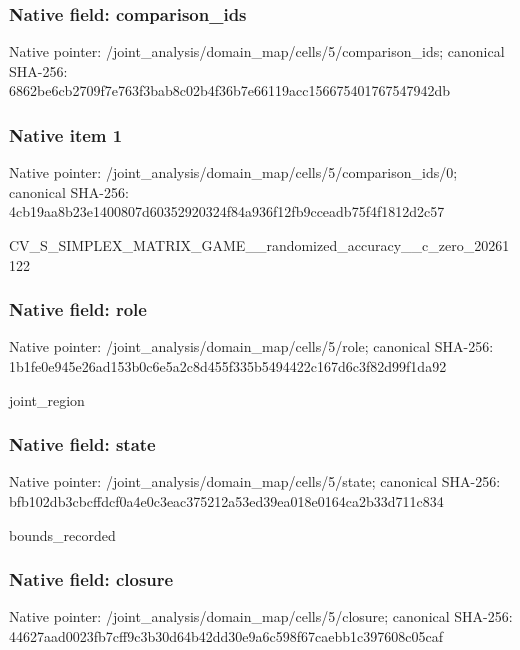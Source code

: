 \documentclass[10pt,a4paper]{article}
\begin{document}
\subsubsection{Native field: comparison\_ids}


Native pointer: /joint\_analysis/domain\_m\allowbreak{}ap/cells/5/comparison\_id\allowbreak{}s; canonical SHA-256: 6862be6cb2709f7e763f3bab\allowbreak{}8c02b4f36b7e66119acc1566\allowbreak{}75401767547942db



\subsubsection{Native item 1}


Native pointer: /joint\_analysis/domain\_m\allowbreak{}ap/cells/5/comparison\_id\allowbreak{}s/0; canonical SHA-256: 4cb19aa8b23e1400807d6035\allowbreak{}2920324f84a936f12fb9ccea\allowbreak{}db75f4f1812d2c57


CV\_S\_SIMPLEX\_MATRIX\_GAME\allowbreak{}\_\_randomized\_accuracy\_\_c\allowbreak{}\_zero\_20261122


\subsubsection{Native field: role}


Native pointer: /joint\_analysis/domain\_map/cells/5/role; canonical SHA-256: 1b1fe0e945e26ad153b0c6e5\allowbreak{}a2c8d455f335b5494422c167\allowbreak{}d6c3f82d99f1da92


joint\_region


\subsubsection{Native field: state}


Native pointer: /joint\_analysis/domain\_m\allowbreak{}ap/cells/5/state; canonical SHA-256: bfb102db3cbcffdcf0a4e0c3\allowbreak{}eac375212a53ed39ea018e01\allowbreak{}64ca2b33d711c834


bounds\_recorded


\subsubsection{Native field: closure}


Native pointer: /joint\_analysis/domain\_m\allowbreak{}ap/cells/5/closure; canonical SHA-256: 44627aad0023fb7cff9c3b30\allowbreak{}d64b42dd30e9a6c598f67cae\allowbreak{}bb1c397608c05caf
\end{document}
